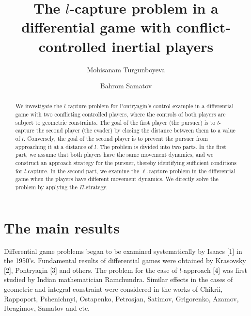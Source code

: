 \documentclass[12pt]{llncs}
\begin{document}
\fi

\title{The $l$-capture problem in a differential game with conflict-controlled inertial players}

\author{Mohisanam Turgunboyeva  \and  Bahrom Samatov
  }

\maketitle

\begin{abstract}
We investigate the $l$-capture problem for Pontryagin's control example in a differential game with two conflicting controlled players, where the controls of both players are subject to geometric constraints. The goal of the first player (the pursuer) is to $l$-capture the second player (the evader) by closing the distance between them to a value of $l$. Conversely, the goal of the second player is to prevent the pursuer from approaching it at a distance of $l$. The problem is divided into two parts. In the first part, we assume that both players have the same movement dynamics, and we construct an approach strategy for the pursuer, thereby identifying sufficient conditions for $l$-capture. In the second part, we examine the $\ell$-capture problem in the differential game when the players have different movement dynamics. We directly solve the problem by applying the $\Pi$-strategy.


\end{abstract}


\section{The main results} %

Differential game problems began to be examined systematically by Isaacs [1] in the 1950's. Fundamental results of differential games were
obtained by Krasovsky [2], Pontryagin [3] and others. The problem for the case of $l$-approach [4] was first studied by Indian mathematician Ramchundra. Similar effects in the cases of geometric and integral constraint were considered in the works of Chikrii,
Rappoport, Pshenichnyi, Ostapenko, Petrosjan, Satimov, Grigorenko, Azamov, Ibragimov, Samatov and etc.
\end{document}
